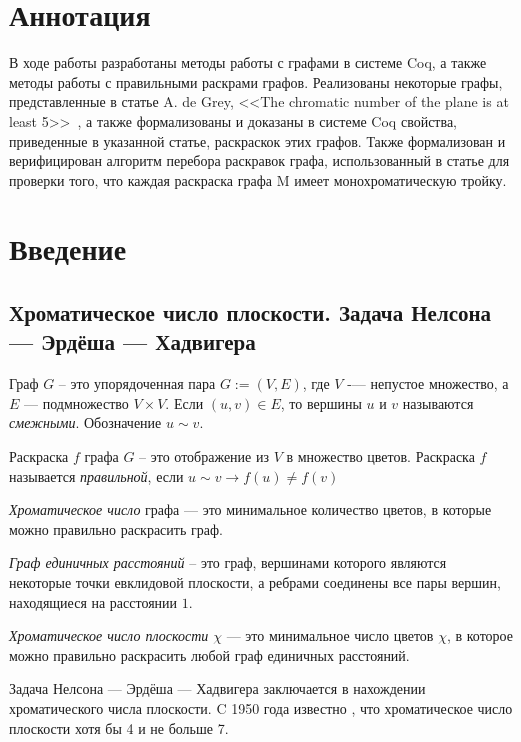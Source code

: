 \chapter*{Аннотация}		%

В ходе работы разработаны методы работы с графами в системе Coq, а также методы работы с правильными раскрами графов. Реализованы некоторые графы, представленные в статье A. de Grey, <<The chromatic number of the plane is at least 5>>~\cite{deGrey}, а также формализованы и доказаны в системе Coq свойства, приведенные в указанной статье, раскраскок этих графов. Также формализован и верифицирован алгоритм перебора раскравок графа, использованный в статье для проверки того, что каждая раскраска графа M имеет монохроматическую тройку.

\chapter*{Введение}		%

\section{Хроматическое число плоскости. Задача Нелсона — Эрдёша — Хадвигера}

Граф $G$ -- это упорядоченная пара $G := (V, E)$, где $V$ -— непустое множество, а $E$ — подмножество $V\times V$. Если $(u, v) \in E$, то вершины $u$ и $v$ называются { \it смежными}. Обозначение $u \sim v$.

Раскраска $f$ графа $G$ -- это отображение из $V$ в множество цветов. 
Раскраска $f$ называется {\it правильной}, если $u \sim v \rightarrow f(u) \neq  f(v)$

{\it Хроматическое число} графа --- это минимальное количество цветов, в которые можно правильно раскрасить граф.

{\it Граф единичных расстояний} -- это граф, вершинами которого являются некоторые точки евклидовой плоскости, а ребрами соединены все пары вершин,  находящиеся на расстоянии $1$.

{\it Хроматическое число плоскости $\chi$ } --- это минимальное число цветов $\chi$, в которое можно правильно раскрасить любой граф единичных расстояний.

Задача Нелсона — Эрдёша — Хадвигера заключается в нахождении хроматического числа плоскости. C 1950 года известно \cite{Soi}, что хроматическое число плоскости хотя бы 4 и не больше 7. 

